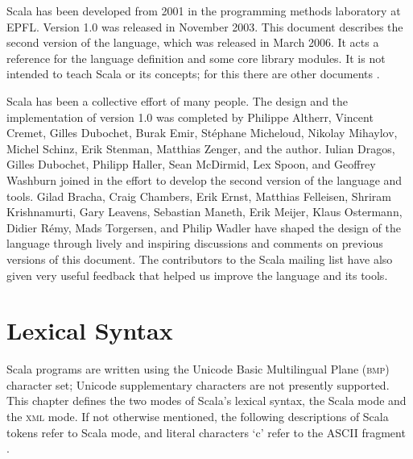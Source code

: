 Scala has been developed from 2001 in the programming methods
laboratory at EPFL. Version 1.0 was released in November 2003. This
document describes the second version of the language, which was
released in March 2006. It acts a reference for the language
definition and some core library modules. It is not intended to teach
Scala or its concepts; for this there are other documents 
\cite{scala-overview-tech-report,%
      odersky:scala-experiment,%
      odersky:sca,%
      odersky-et-al:ecoop03,%
      odersky-zenger:fool12}.

Scala has been a collective effort of many people. The design and the
implementation of version 1.0 was completed by Philippe Altherr,
Vincent Cremet, Gilles Dubochet, Burak Emir, St\'ephane Micheloud,
Nikolay Mihaylov, Michel Schinz, Erik Stenman, Matthias Zenger, and
the author. Iulian Dragos, Gilles Dubochet, Philipp Haller, Sean
McDirmid, Lex Spoon, and Geoffrey Washburn joined in the effort to
develop the second version of the language and tools.  Gilad Bracha,
Craig Chambers, Erik Ernst, Matthias Felleisen, Shriram Krishnamurti,
Gary Leavens, Sebastian Maneth, Erik Meijer, Klaus Ostermann, Didier
R\'emy, Mads Torgersen, and Philip Wadler have shaped the design of
the language through lively and inspiring discussions and comments on
previous versions of this document.  The contributors to the Scala
mailing list have also given very useful feedback that helped us
improve the language and its tools.

\chapter{Lexical Syntax}

Scala programs are written using the Unicode Basic Multilingual Plane
(\textsc{bmp}) character set; Unicode supplementary characters are not
presently supported.  This chapter defines the two modes of Scala's
lexical syntax, the Scala mode and the \textsc{xml} mode. If not
otherwise mentioned, the following descriptions of Scala tokens refer
to Scala mode, and literal characters `c' refer to the ASCII fragment
.

